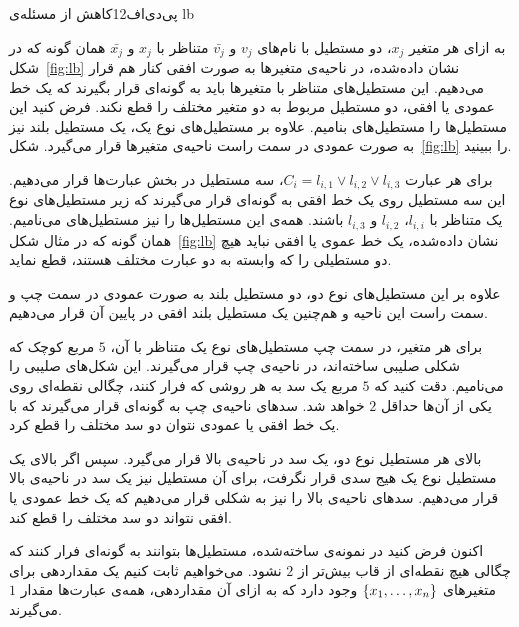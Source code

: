 ‌پی‌دی‌اف{12}{کاهش از مسئله‌ی }{lb}


 به ازای هر متغیر $x_{j}$، دو مستطیل با نام‌های $v_{j}$ و $\bar{v_{j}}$ متناظر با $x_{j}$ و $\bar{x_{j}}$ همان گونه که در شکل~\ref{fig:lb} نشان داده‌شده، در ناحیه‌ی متغیر‌ها به صورت افقی کنار هم قرار می‌دهیم. این مستطیل‌های متناظر با متغیرها باید به گونه‌ای قرار بگیرند که یک خط عمودی یا افقی، دو مستطیل مربوط به دو متغیر مختلف را قطع نکند. فرض کنید این مستطیل‌ها را مستطیل‌های  بنامیم. علاوه بر مستطیل‌های نوع یک، یک مستطیل بلند نیز به صورت عمودی در سمت راست ناحیه‌ی متغیر‌ها قرار می‌گیرد. شکل~\ref{fig:lb}  را ببینید.

 برای هر عبارت $C_i = l_{i, 1} \vee l_{i, 2} \vee l_{i, 3}$، سه مستطیل در بخش عبارت‌ها قرار می‌دهیم. این سه مستطیل روی یک خط افقی به گونه‌ای قرار می‌گیرند که زیر مستطیل‌های نوع یک متناظر با $l_{i, i}$، $l_{i, 2}$ و $l_{i, 3}$ باشند. همه‌ی این مستطیل‌ها را نیز مستطیل‌های  می‌نامیم. همان گونه که در مثال شکل~\ref{fig:lb}  نشان داده‌شده، یک خط عموی یا افقی نباید هیچ دو مستطیلی را که وابسته به دو عبارت مختلف هستند، قطع نماید.

علاوه بر این مستطیل‌های نوع دو، دو مستطیل بلند به صورت عمودی در سمت چپ و سمت راست این ناحیه و هم‌چنین یک مستطیل بلند افقی در پایین آن قرار می‌دهیم.

 برای هر متغیر، در سمت چپ مستطیل‌های نوع یک متناظر با آن، $5$ مربع کوچک که شکلی صلیبی ساخته‌اند، در ناحیه‌ی چپ قرار می‌گیرند. این شکل‌های صلیبی را  می‌نامیم. دقت کنید که $5$ مربع یک سد به هر روشی که فرار کنند، چگالی نقطه‌ای روی یکی از آن‌ها حد‌اقل $2$ خواهد شد. سد‌های ناحیه‌ی چپ به گونه‌ای قرار می‌گیرند که با یک خط افقی یا عمودی نتوان دو سد مختلف را قطع کرد.

 بالای هر مستطیل نوع دو، یک سد در ناحیه‌ی بالا قرار می‌گیرد. سپس اگر بالای یک مستطیل نوع یک هیج سدی قرار نگرفت، برای آن مستطیل نیز یک سد در ناحیه‌ی بالا قرار می‌دهیم. سد‌های ناحیه‌ی بالا را نیز به شکلی قرار می‌دهیم که یک خط عمودی یا افقی نتواند دو سد مختلف را قطع کند.


اکنون فرض کنید در نمونه‌ی ساخته‌شده، مستطیل‌ها بتوانند به گونه‌ای فرار کنند که چگالی هیچ نقطه‌ای از قاب بیش‌تر از $2$ نشود. می‌خواهیم ثابت کنیم یک مقداردهی برای متغیر‌های ${\{ x_{1}, \ldots, x_{n} \}}$ وجود دارد که به ازای آن مقداردهی، همه‌ی عبارت‌ها مقدار $1$ می‌گیرند.

